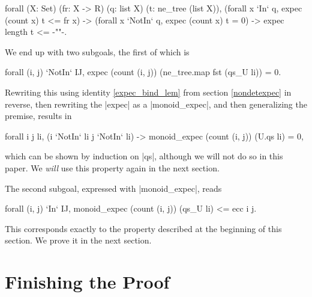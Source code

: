 \documentclass[runningheads]{llncs}
\begin{document}
\begin{code}
  forall (X: Set) (fr: X -> R) (q: list X) (t: ne_tree (list X)),
    (forall x `In` q, expec (count x) t <= fr x) ->
    (forall x `NotIn` q, expec (count x) t = 0) -> expec length t <= {-""-}.
\end{code}
We end up with two subgoals, the first of which is \begin{code}forall (i, j) `NotIn` IJ, expec (count (i, j)) (ne_tree.map fst (qs_U li)) = 0.\end{code} Rewriting this using identity \ref{expec_bind_lem} from section \ref{nondetexpec} in reverse, then rewriting the |expec| as a |monoid_expec|, and then generalizing the premise, results in
\begin{code}
  forall i j li, (i `NotIn` li \/ j `NotIn` li) -> monoid_expec (count (i, j)) (U.qs li) = 0,
\end{code}
which can be shown by induction on |qs|, although we will not do so in this paper. We \emph{will} use this property again in the next section.

The second subgoal, expressed with |monoid_expec|, reads
\begin{code}
  forall (i, j) `In` IJ, monoid_expec (count (i, j)) (qs_U li) <= ecc i j.
\end{code}
This corresponds exactly to the property described at the beginning of this section. We prove it in the next section.

\section{Finishing the Proof}
\label{finishing}
\end{document}
